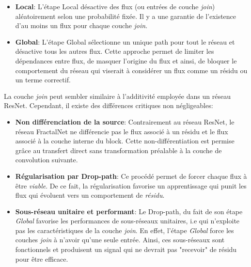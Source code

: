 \begin{itemize}
    \item \textbf{Local}: L'étape Local désactive des flux (ou entrées de couche \textit{join}) aléatoirement selon une probabilité fixée. Il y a une garantie de l'existence d'au moins un flux pour chaque couche \textit{join}.

    \item \textbf{Global}: L'étape Global sélectionne un unique path pour tout le réseau et désactive tous les autres flux. Cette approche permet de limiter les dépendances entre flux, de masquer l'origine du flux et ainsi, de bloquer le comportement du réseau qui viserait à considérer un flux comme un résidu ou un terme correctif.
\end{itemize}

\noindent La couche \textit{join} peut sembler similaire à l'additivité employée dans un réseau ResNet. Cependant, il existe des différences critiques non négligeables:

\begin{itemize}
    \item \textbf{Non différenciation de la source}: Contrairement au réseau ResNet, le réseau FractalNet ne différencie pas le flux associé à un résidu et le flux associé à la couche interne du block. Cette non-différentiation est permise grâce au transfert direct sans transformation préalable à la couche de convolution suivante.

    \item \textbf{Régularisation par Drop-path}: Ce procédé permet de forcer chaque flux à être \textit{viable}. De ce fait, la régularisation favorise un apprentissage qui punit les flux qui évoluent vers un comportement de \textit{résidu}.

    \item \textbf{Sous-réseau unitaire et performant}: Le Drop-path, du fait de son étape \textit{Global} favorise les performances de sous-réseaux unitaires, i.e qui n'exploite pas les caractéristiques de la couche \textit{join}. En effet, l'étape \textit{Global} force les couches \textit{join} à n'avoir qu'une seule entrée. Ainsi, ces sous-réseaux sont fonctionnels et produisent un signal qui ne devrait pas "recevoir" de résidu pour être efficace.
\end{itemize}

